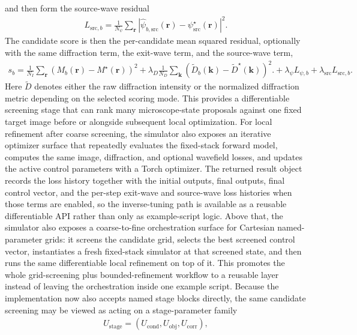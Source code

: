 \documentclass[11pt]{article}
\begin{document}
and then form the source-wave residual
\begin{align}
  L_{\mathrm{src},b}
  =
  \frac{1}{N_\psi}
  \sum_{\mathbf{r}}
  \left|
    \widehat{\psi}_{b,\mathrm{src}}(\mathbf{r})
    -
    \psi^\star_{\mathrm{src}}(\mathbf{r})
  \right|^2.
\end{align}
The candidate score is then the per-candidate mean squared residual, optionally with
the same diffraction term, the exit-wave term, and the source-wave term,
\begin{align}
  s_b
  =
  \frac{1}{N_I}\sum_{\mathbf{r}} \left(M_b(\mathbf{r}) - M^\star(\mathbf{r})\right)^2
  +
  \lambda_D
  \frac{1}{N_D}
  \sum_{\mathbf{k}}
  \left(
    \widetilde{D}_b(\mathbf{k}) - \widetilde{D}^{\star}(\mathbf{k})
  \right)^2.
  +
  \lambda_\psi L_{\psi,b}
  +
  \lambda_{\mathrm{src}} L_{\mathrm{src},b}.
\end{align}
Here \(\widetilde{D}\) denotes either the raw diffraction intensity or the normalized
diffraction metric depending on the selected scoring mode.
This provides a differentiable screening stage that can rank many microscope-state
proposals against one fixed target image before or alongside subsequent local
optimization.
For local refinement after coarse screening, the simulator also exposes an iterative
optimizer surface that repeatedly evaluates the fixed-stack forward model, computes the
same image, diffraction, and optional wavefield losses, and updates the active control
parameters with a Torch optimizer.  The returned result object records the
loss history together with the initial outputs, final outputs, final control vector,
and the per-step exit-wave and source-wave loss histories when those terms are enabled,
so the inverse-tuning path is available as a reusable differentiable API rather than
only as example-script logic.
Above that, the simulator also exposes a coarse-to-fine orchestration surface for
Cartesian named-parameter grids: it screens the candidate grid, selects the best
screened control vector, instantiates a fresh fixed-stack simulator at that screened
state, and then runs the same differentiable local refinement on top of it.  This
promotes the whole grid-screening plus bounded-refinement workflow to a reusable layer
instead of leaving the orchestration inside one example script.
Because the implementation now also accepts named stage blocks directly, the same
candidate screening may be viewed as acting on a stage-parameter family
\begin{align}
  U_{\mathrm{stage}} =
  \left(
    U_{\mathrm{cond}},
    U_{\mathrm{obj}},
    U_{\mathrm{corr}}
  \right),
\end{align}
\end{document}
